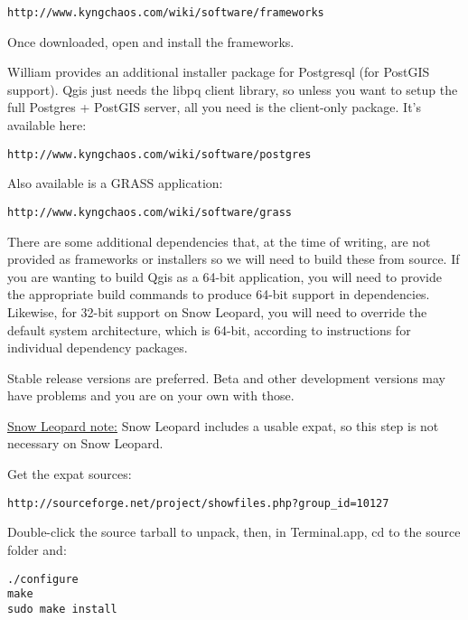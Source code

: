 \begin{verbatim}
http://www.kyngchaos.com/wiki/software/frameworks
\end{verbatim}

Once downloaded, open and install the frameworks.

William provides an additional installer package for Postgresql (for PostGIS support).
Qgis just needs the libpq client library, so unless you want to setup the full
Postgres + PostGIS server, all you need is the client-only package.
It's available here:

\begin{verbatim}
http://www.kyngchaos.com/wiki/software/postgres 
\end{verbatim}

Also available is a GRASS application:

\begin{verbatim}
http://www.kyngchaos.com/wiki/software/grass
\end{verbatim}

\hypertarget{toc26}{}
There are some additional dependencies that, at the time of writing, are not
provided as frameworks or installers so we will need to build these from source.
If you are wanting to build Qgis as a 64-bit application, you will need to 
provide the appropriate build commands to produce 64-bit support in dependencies.
Likewise, for 32-bit support on Snow Leopard, you will need to override the
default system architecture, which is 64-bit, according to instructions for
individual dependency packages.

Stable release versions are preferred.  Beta and other development versions may
have problems and you are on your own with those.

\hypertarget{toc27}{}
\underline{Snow Leopard note:} Snow Leopard includes a usable expat, so this step is 
not necessary on Snow Leopard.

Get the expat sources:

\begin{verbatim}
http://sourceforge.net/project/showfiles.php?group_id=10127 
\end{verbatim}

Double-click the source tarball to unpack, then, in Terminal.app, cd to the source folder and:

\begin{verbatim}
./configure
make 
sudo make install 
\end{verbatim}

